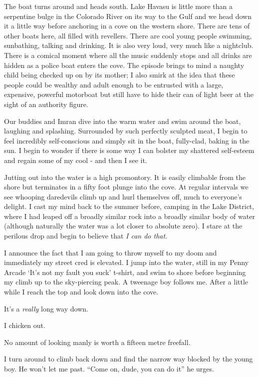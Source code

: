 \documentclass[a5paper,titlepage,11pt]{book}
\begin{document}
The boat turns around and heads south.  Lake Havasu is little more than a serpentine bulge in the Colorado River on its way to the Gulf and we head down it a little way before anchoring in a cove on the western shore.  There are tens of other boats here, all filled with revellers.  There are cool young people swimming, sunbathing, talking and drinking.  It is also very loud, very much like a nightclub.  There is a comical moment where all the music suddenly stops and all drinks are hidden as a police boat enters the cove.  The episode brings to mind a naughty child being checked up on by its mother; I also smirk at the idea that these people could be wealthy and adult enough to be entrusted with a large, expensive, powerful motorboat but still have to hide their can of light beer at the sight of an authority figure.

Our buddies and Imran dive into the warm water and swim around the boat, laughing and splashing.  Surrounded by such perfectly sculpted meat, I begin to feel incredibly self-conscious and simply sit in the boat, fully-clad, baking in the sun.  I begin to wonder if there is some way I can bolster my shattered self-esteem and regain some of my cool - and then I see it.

Jutting out into the water is a high promontory.  It is easily climbable from the shore but terminates in a fifty foot plunge into the cove.  At regular intervals we see whooping daredevils climb up and hurl themselves off, much to everyone's delight.  I cast my mind back to the summer before, camping in the Lake District, where I had leaped off a broadly similar rock into a broadly similar body of water (although naturally the water was a lot closer to absolute zero).  I stare at the perilous drop and begin to believe that \emph{I can do that}.

I announce the fact that I am going to throw myself to my doom and immediately my street cred is elevated.  I jump into the water, still in my Penny Arcade `It's not my fault you suck' t-shirt, and swim to shore before beginning my climb up to the sky-piercing peak.  A tweenage boy follows me.  After a little while I reach the top and look down into the cove.

It's a \emph{really} long way down.

I chicken out.

No amount of looking manly is worth a fifteen metre freefall.

I turn around to climb back down and find the narrow way blocked by the young boy.  He won't let me past. ``Come on, dude, you can do it'' he urges.
\end{document}
